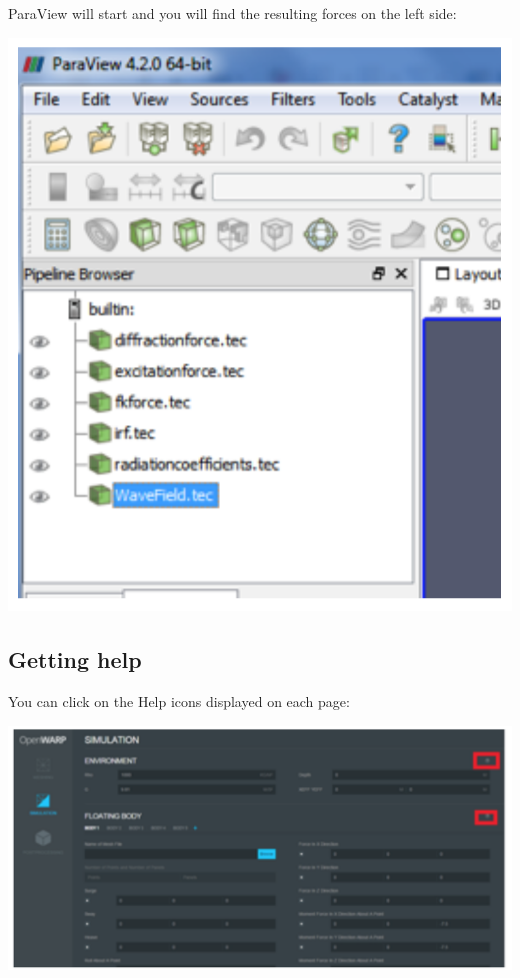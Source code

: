 \documentclass[12pt]{article}
\begin{document}
ParaView will start and you will find the resulting forces on the left side:


\vspace{\abovedisplayskip}
\begin{minipage}{\linewidth}
	\centering
	\includegraphics[scale=0.5]{img/38}
\end{minipage}
\vspace{\belowdisplayskip}

\subsection{Getting help}

You can click on the Help icons displayed on each page:

\vspace{\abovedisplayskip}
\begin{minipage}{\linewidth}
	\centering
	\includegraphics[scale=0.4]{img/39}
\end{minipage}
\vspace{\belowdisplayskip}
\end{document}
